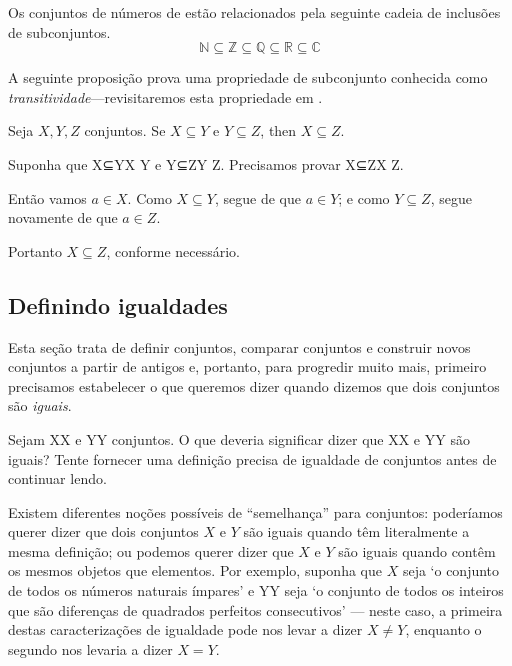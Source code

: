 \begin{example}
Os conjuntos de números de  estão relacionados pela seguinte cadeia de inclusões de subconjuntos.
\[ \mathbb{N} \subseteq \mathbb{Z} \subseteq \mathbb{Q} \subseteq \mathbb{R} \subseteq \mathbb{C} \]
\end{example}

A seguinte proposição prova uma propriedade de subconjunto conhecida como \textit{transitividade}---revisitaremos esta propriedade em .

\begin{proposition}
\label{propSubsetTransitive}
Seja $X,Y,Z$ conjuntos. Se $X \subseteq Y$ e $Y \subseteq Z$, then $X \subseteq Z$.
\end{proposition}

\begin{cproof}
Suponha que X⊆YX \subseteq Y e Y⊆ZY \subseteq Z. Precisamos provar X⊆ZX \subseteq Z.

Então vamos $a \in X$. Como $X \subseteq Y$, segue de  que $a \in Y$; e como $Y \subseteq Z$, segue novamente de  que $a \in Z$.

Portanto $X \subseteq Z$, conforme necessário.
\end{cproof}

\subsection*{Definindo igualdades}

Esta seção trata de definir conjuntos, comparar conjuntos e construir novos conjuntos a partir de antigos e, portanto, para progredir muito mais, primeiro precisamos estabelecer o que queremos dizer quando dizemos que dois conjuntos são \textit{iguais}.

\begin{discussion}
\label{dscSetEquality}
Sejam XX e YY conjuntos. O que deveria significar dizer que XX e YY são iguais? Tente fornecer uma definição precisa de igualdade de conjuntos antes de continuar lendo.
\end{discussion}

Existem diferentes noções possíveis de “semelhança” para conjuntos: poderíamos querer dizer que dois conjuntos $X$ e $Y$ são iguais quando têm literalmente a mesma definição; ou podemos querer dizer que $X$ e $Y$ são iguais quando contêm os mesmos objetos que elementos. Por exemplo, suponha que $X$ seja `o conjunto de todos os números naturais ímpares' e YY seja `o conjunto de todos os inteiros que são diferenças de quadrados perfeitos consecutivos' --- neste caso, a primeira destas caracterizações de igualdade pode nos levar a dizer $X \ne Y$, enquanto o segundo nos levaria a dizer $X = Y$.


